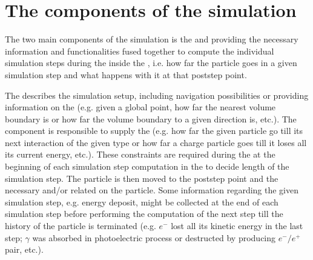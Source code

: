 \documentclass[letterpaper,10pt,english]{sphinxmanual}
\begin{document}
\chapter{The components of the simulation}
\label{\detokenize{IntroAndInstall/components:the-components-of-the-simulation}}\label{\detokenize{IntroAndInstall/components:simulation-components-doc}}\label{\detokenize{IntroAndInstall/components::doc}}
\sphinxAtStartPar
The two main components of the simulation is the {\hyperref[\detokenize{IntroAndInstall/components:geometry}]{}} and {\hyperref[\detokenize{IntroAndInstall/components:physics}]{}} providing the necessary information and functionalities fused together
to compute the individual simulation steps during the {\hyperref[\detokenize{IntroAndInstall/components:event-processing}]{}} inside the {\hyperref[\detokenize{IntroAndInstall/components:stepping-loop}]{}}, i.e. how far the particle goes
in a given simulation step and what happens with it at that post\sphinxhyphen{}step point.

\sphinxAtStartPar
The {\hyperref[\detokenize{IntroAndInstall/components:geometry}]{}} describes the simulation setup, including navigation possibilities or providing information on the  (e.g. given a global point, how far the nearest volume boundary is or how far the volume boundary to a given
direction is, etc.). The {\hyperref[\detokenize{IntroAndInstall/components:physics}]{}} component is responsible to supply the 
(e.g. how far the given particle go till its next interaction of the given type or how far a charge particle goes till it loses all its current
energy, etc.). These constraints are required during the {\hyperref[\detokenize{IntroAndInstall/components:event-processing}]{}} at the beginning of each simulation step computation in the
{\hyperref[\detokenize{IntroAndInstall/components:stepping-loop}]{}} to decide length of the simulation step. The particle is then moved to the post\sphinxhyphen{}step point and the necessary {\hyperref[\detokenize{IntroAndInstall/components:geometry}]{}}
and/or {\hyperref[\detokenize{IntroAndInstall/components:physics}]{}} related  on the particle. Some information regarding the given simulation step, e.g. energy deposit,
might be collected at the end of each simulation step before performing the computation of the next step till the history of the particle is
terminated (e.g. \(e^-\) lost all its kinetic energy in the last step; \(\gamma\) was absorbed in photoelectric process or destructed by
producing \(e^-/e^+\) pair, etc.).
\end{document}
